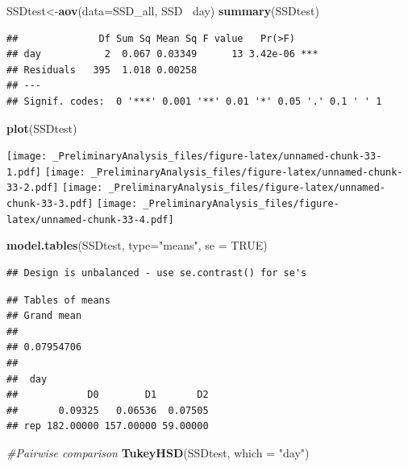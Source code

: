 \documentclass[
]{article}
\newenvironment{Shaded}{\begin{snugshade}}{\end{snugshade}}
\newcommand{\CommentTok}[1]{\textcolor[rgb]{0.56,0.35,0.01}{\textit{#1}}}
\newcommand{\DataTypeTok}[1]{\textcolor[rgb]{0.13,0.29,0.53}{#1}}
\newcommand{\KeywordTok}[1]{\textcolor[rgb]{0.13,0.29,0.53}{\textbf{#1}}}
\newcommand{\NormalTok}[1]{#1}
\newcommand{\OperatorTok}[1]{\textcolor[rgb]{0.81,0.36,0.00}{\textbf{#1}}}
\newcommand{\OtherTok}[1]{\textcolor[rgb]{0.56,0.35,0.01}{#1}}
\newcommand{\StringTok}[1]{\textcolor[rgb]{0.31,0.60,0.02}{#1}}
\begin{document}
\begin{Shaded}
\begin{Highlighting}[]
\NormalTok{SSDtest<-}\KeywordTok{aov}\NormalTok{(}\DataTypeTok{data=}\NormalTok{SSD_all, SSD }\OperatorTok{~}\NormalTok{day)}
\KeywordTok{summary}\NormalTok{(SSDtest)}
\end{Highlighting}
\end{Shaded}

\begin{verbatim}
##              Df Sum Sq Mean Sq F value   Pr(>F)    
## day           2  0.067 0.03349      13 3.42e-06 ***
## Residuals   395  1.018 0.00258                     
## ---
## Signif. codes:  0 '***' 0.001 '**' 0.01 '*' 0.05 '.' 0.1 ' ' 1
\end{verbatim}

\begin{Shaded}
\begin{Highlighting}[]
\KeywordTok{plot}\NormalTok{(SSDtest)}
\end{Highlighting}
\end{Shaded}

\texttt{[image: \_PreliminaryAnalysis\_files/figure-latex/unnamed-chunk-33-1.pdf]}
\texttt{[image: \_PreliminaryAnalysis\_files/figure-latex/unnamed-chunk-33-2.pdf]}
\texttt{[image: \_PreliminaryAnalysis\_files/figure-latex/unnamed-chunk-33-3.pdf]}
\texttt{[image: \_PreliminaryAnalysis\_files/figure-latex/unnamed-chunk-33-4.pdf]}

\begin{Shaded}
\begin{Highlighting}[]
\KeywordTok{model.tables}\NormalTok{(SSDtest, }\DataTypeTok{type=}\StringTok{"means"}\NormalTok{, }\DataTypeTok{se =} \OtherTok{TRUE}\NormalTok{)}
\end{Highlighting}
\end{Shaded}

\begin{verbatim}
## Design is unbalanced - use se.contrast() for se's
\end{verbatim}

\begin{verbatim}
## Tables of means
## Grand mean
##            
## 0.07954706 
## 
##  day 
##            D0        D1       D2
##       0.09325   0.06536  0.07505
## rep 182.00000 157.00000 59.00000
\end{verbatim}

\begin{Shaded}
\begin{Highlighting}[]
\CommentTok{#Pairwise comparison}
\KeywordTok{TukeyHSD}\NormalTok{(SSDtest, }\DataTypeTok{which =} \StringTok{"day"}\NormalTok{)}
\end{Highlighting}
\end{Shaded}
\end{document}
